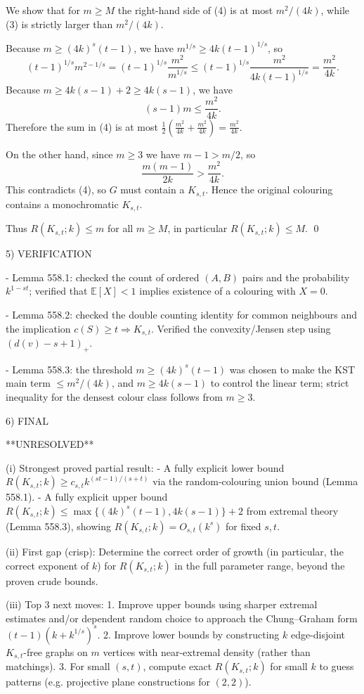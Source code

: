 We show that for $m\ge M$ the right-hand side of (4) is at most $m^2/(4k)$, while (3) is strictly larger than $m^2/(4k)$.

Because $m\ge (4k)^s(t-1)$, we have $m^{1/s}\ge 4k(t-1)^{1/s}$, so
\[
(t-1)^{1/s}m^{2-1/s}=(t-1)^{1/s}\frac{m^2}{m^{1/s}}\le (t-1)^{1/s}\frac{m^2}{4k(t-1)^{1/s}}=\frac{m^2}{4k}.
\]
Because $m\ge 4k(s-1)+2\ge 4k(s-1)$, we have
\[
(s-1)m\le \frac{m^2}{4k}.
\]
Therefore the sum in (4) is at most $\frac12(\frac{m^2}{4k}+\frac{m^2}{4k})=\frac{m^2}{4k}$.

On the other hand, since $m\ge 3$ we have $m-1>m/2$, so
\[
\frac{m(m-1)}{2k}>\frac{m^2}{4k}.
\]
This contradicts (4), so $G$ must contain a $K_{s,t}$.
Hence the original colouring contains a monochromatic $K_{s,t}$.

Thus $R(K_{s,t};k)\le m$ for all $m\ge M$, in particular $R(K_{s,t};k)\le M$.
\qed

5) VERIFICATION

- Lemma 558.1: checked the count of ordered $(A,B)$ pairs and the probability $k^{1-st}$; verified that $\mathbb E[X]<1$ implies existence of a colouring with $X=0$.

- Lemma 558.2: checked the double counting identity for common neighbours and the implication $c(S)\ge t\Rightarrow K_{s,t}$. Verified the convexity/Jensen step using $(d(v)-s+1)_+$.

- Lemma 558.3: the threshold $m\ge (4k)^s(t-1)$ was chosen to make the KST main term $\le m^2/(4k)$, and $m\ge 4k(s-1)$ to control the linear term; strict inequality for the densest colour class follows from $m\ge 3$.

6) FINAL

**UNRESOLVED**

(i) Strongest proved partial result:
- A fully explicit lower bound $R(K_{s,t};k)\ge c_{s,t}k^{(st-1)/(s+t)}$ via the random-colouring union bound (Lemma 558.1).
- A fully explicit upper bound $R(K_{s,t};k)\le \max\{(4k)^s(t-1),4k(s-1)\}+2$ from extremal theory (Lemma 558.3), showing $R(K_{s,t};k)=O_{s,t}(k^s)$ for fixed $s,t$.

(ii) First gap (crisp):
Determine the correct order of growth (in particular, the correct exponent of $k$) for $R(K_{s,t};k)$ in the full parameter range, beyond the proven crude bounds.

(iii) Top 3 next moves:
1. Improve upper bounds using sharper extremal estimates and/or dependent random choice to approach the Chung--Graham form $(t-1)(k+k^{1/s})^s$.
2. Improve lower bounds by constructing $k$ edge-disjoint $K_{s,t}$-free graphs on $m$ vertices with near-extremal density (rather than matchings).
3. For small $(s,t)$, compute exact $R(K_{s,t};k)$ for small $k$ to guess patterns (e.g. projective plane constructions for $(2,2)$).

